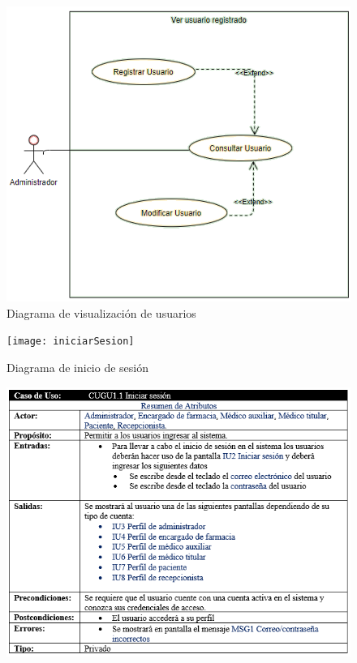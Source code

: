 \documentclass[12pt,letterpaper]{article}
\begin{document}
{        \begin{figure}[H]
            \centering
            \includegraphics [scale=0.3]{verUsuario}
            \caption{Diagrama de visualización de usuarios}
        \end{figure}
        \begin{figure}[H]
            \centering
            \texttt{[image: iniciarSesion]}
            \caption{Diagrama de inicio de sesión}
        \end{figure}
        \begin{figure}[H]
            \centering
            \includegraphics [scale=0.9]{especificacionInicio}

\end{figure}}
\end{document}
